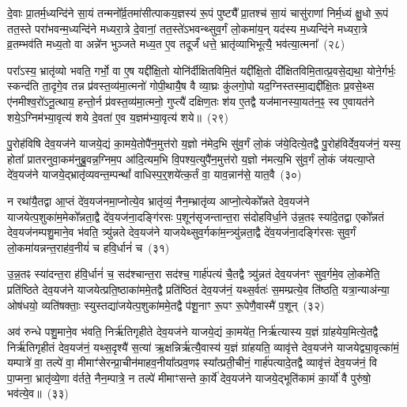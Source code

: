 दे॒वाः प्रा॒तर्म॒ध्यन्दि॑ने सा॒यं तन्मनो᳚र्व्र॒तमा॑सीत्पाकय॒ज्ञस्य॑ रू॒पं पुष्ट्यै᳚ प्रा॒तश्च॑ सा॒यं चासु॑राणां निर्म॒ध्यं क्षु॒धो रू॒पं तत॒स्ते परा॑भवन्म॒ध्यन्दि॑ने मध्यरा॒त्रे दे॒वानां॒ तत॒स्ते॑\-ऽभवन्थ्सुव॒र्गं लो॒कमा॑य॒न् यद॑स्य म॒ध्यन्दि॑ने मध्यरा॒त्रे व्र॒तम्भव॑ति मध्य॒तो वा अन्ने॑न भुञ्जते मध्य॒त ए॒व तदूर्जं॑ धत्ते॒ भ्रातृ॑व्याभिभूत्यै॒ भव॑त्या॒त्मना᳚~(२८)




परा᳚\-ऽस्य॒ भ्रातृ॑व्यो भवति॒ गर्भो॒ वा ए॒ष यद्दी᳚क्षि॒तो योनि॑र्दीक्षितविमि॒तं यद्दी᳚क्षि॒तो दी᳚क्षितविमि॒तात्प्र॒वसे॒द्यथा॒ योने॒र्गर्भः॒ स्कन्द॑ति ता॒दृगे॒व तन्न प्र॑वस्त॒व्य॑मा॒त्मनो॑ गोपी॒थायै॒ष वै व्या॒घ्रः कु॑लगो॒पो यद॒ग्निस्तस्मा॒द्यद्दी᳚क्षि॒तः प्र॒वसे॒थ्स ए॑नमीश्व॒रो॑\-ऽनू॒त्थाय॒ हन्तो॒र्न प्र॑वस्त॒व्य॑मा॒त्मनो॒ गुप्त्यै॑ दक्षिण॒तः श॑य ए॒तद्वै यज॑मानस्या॒यत॑न॒ꣴ॒ स्व ए॒वायत॑ने शये॒\-ऽग्निम॑भ्या॒वृत्य॑ शये दे॒वता॑ ए॒व य॒ज्ञम॑भ्या॒वृत्य॑ शये॥~(२९)

{\anuvakamend[{ए॒तद्वै क्रू॒र इ॒वैक॑व्रता आ॒त्मना॒ यज॑मानस्य॒ त्रयो॑दश च}]}%

पु॒रोह॑विषि देव॒यज॑ने याजये॒द्यं का॒मये॒तोपै॑न॒मुत्त॑रो य॒ज्ञो न॑मेद॒भि सु॑व॒र्गं लो॒कं ज॑ये॒दित्ये॒तद्वै पु॒रोह॑विर्देव॒यज॑नं॒ यस्य॒ होता᳚ प्रातरनुवा॒कम॑नुब्रु॒वन्न॒ग्निम॒प आ॑दि॒त्यम॒भि वि॒पश्य॒त्युपै॑न॒मुत्त॑रो य॒ज्ञो न॑मत्य॒भि सु॑व॒र्गं लो॒कं ज॑यत्या॒प्ते दे॑व॒यज॑ने याजये॒द्भ्रातृ॑व्यवन्त॒म्पन्थां᳚ वाधिस्प॒र्॒\mbox{}शये॑त्क॒र्तं वा॒ याव॒न्नान॑से॒ यात॒वै~(३०)

न रथा॑यै॒तद्वा आ॒प्तं दे॑व॒यज॑नमा॒प्नोत्ये॒व भ्रातृ॑व्यं॒ नैन॒म्भ्रातृ॑व्य आप्नो॒त्येको᳚न्नते देव॒यज॑ने याजयेत्प॒शुका॑म॒मेको᳚न्नता॒द्वै दे॑व॒यज॑ना॒दङ्गि॑रसः प॒शून॑सृजन्तान्त॒रा स॑दोहविर्धा॒ने उ॑न्न॒तꣴ स्या॑दे॒तद्वा एको᳚न्नतं देव॒यज॑नम्पशु॒माने॒व भ॑वति॒ त्र्यु॑न्नते देव॒यज॑ने याजयेथ्सुव॒र्गका॑म॒न्त्र्यु॑न्नता॒द्वै दे॑व॒यज॑ना॒दङ्गि॑रसः सुव॒र्गं लो॒कमा॑यन्नन्त॒राह॑व॒नीयं॑ च हवि॒र्धानं॑ च~(३१)

उ॒न्न॒तꣴ स्या॑दन्त॒रा ह॑वि॒र्धानं॑ च॒ सद॑श्चान्त॒रा सद॑श्च॒ गार्\mbox{}ह॑पत्यं चै॒तद्वै त्र्यु॑न्नतं देव॒यज॑नꣳ सुव॒र्गमे॒व लो॒कमे॑ति॒ प्रति॑ष्ठिते देव॒यज॑ने याजयेत्प्रति॒ष्ठाका॑ममे॒तद्वै प्रति॑ष्ठितं देव॒यज॑नं॒ यथ्स॒र्वतः॑ स॒मम्प्रत्ये॒व ति॑ष्ठति॒ यत्रा॒न्याअ॑न्या॒ ओष॑धयो॒ व्यति॑षक्ताः॒ स्युस्तद्या॑जयेत्प॒शुका॑ममे॒तद्वै प॑शू॒नाꣳ रू॒पꣳ रू॒पेणै॒वास्मै॑ प॒शून्~(३२)

अव॑ रुन्धे पशु॒माने॒व भ॑वति॒ निर्\mbox{}ऋ॑तिगृहीते देव॒यज॑ने याजये॒द्यं का॒मये॑त॒ निर्\mbox{}ऋ॑त्यास्य य॒ज्ञं ग्रा॑हयेय॒मित्ये॒तद्वै निर्\mbox{}ऋ॑तिगृहीतं देव॒यज॑नं॒ यथ्स॒दृश्यै॑ स॒त्या॑ ऋ॒क्षन्निर्\mbox{}ऋ॑त्यै॒वास्य॑ य॒ज्ञं ग्रा॑हयति॒ व्यावृ॑त्ते देव॒यज॑ने याजयेद्व्या॒वृत्का॑मं॒ यम्पात्रे॑ वा॒ तल्पे॑ वा॒ मीमाꣳ॑सेरन्प्रा॒चीन॑माहव॒नीया᳚त्प्रव॒णꣴ स्या᳚त्प्रती॒चीनं॒ गार्\mbox{}ह॑पत्यादे॒तद्वै व्यावृ॑त्तं देव॒यज॑नं॒ वि पा॒प्मना॒ भ्रातृ॑व्ये॒णा व॑र्तते॒ नैन॒म्पात्रे॒ न तल्पे॑ मीमाꣳसन्ते का॒र्ये॑ देव॒यज॑ने याजये॒द्भूति॑कामं का॒र्यो॑ वै पुरु॑षो॒ भव॑त्ये॒व॥~(३३)

